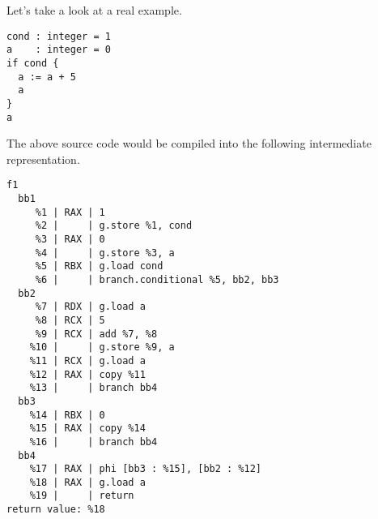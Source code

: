\documentclass[
12pt,
letterpaper,
oneside,
]{memoir}
\begin{document}
Let's take a look at a real example.

\begin{verbatim}
cond : integer = 1
a    : integer = 0
if cond {
  a := a + 5
  a
}
a
\end{verbatim}

\filbreak

The above source code would be compiled into the following intermediate representation.

\begin{verbatim}
f1
  bb1
     %1 | RAX | 1
     %2 |     | g.store %1, cond
     %3 | RAX | 0
     %4 |     | g.store %3, a
     %5 | RBX | g.load cond
     %6 |     | branch.conditional %5, bb2, bb3
  bb2
     %7 | RDX | g.load a
     %8 | RCX | 5
     %9 | RCX | add %7, %8
    %10 |     | g.store %9, a
    %11 | RCX | g.load a
    %12 | RAX | copy %11
    %13 |     | branch bb4
  bb3
    %14 | RBX | 0
    %15 | RAX | copy %14
    %16 |     | branch bb4
  bb4
    %17 | RAX | phi [bb3 : %15], [bb2 : %12]
    %18 | RAX | g.load a
    %19 |     | return
return value: %18
\end{verbatim}
\end{document}
